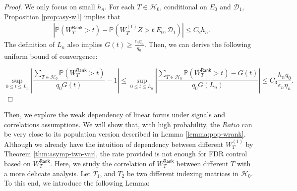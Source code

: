 \documentclass[12pt]{article}
\newcommand{\abs}[1]{\left\lvert#1\right\rvert}
\newcommand{\PP}{\mathbb{P}}
\newcommand{\cH}{\mathcal{H}}
\newcommand{\cD}{\mathcal{D}}
\def\PP{{\mathbb P}}
\theoremstyle{plain}
\begin{document}
\begin{proof}
We only focus on small $h_n$. For each $T\in \cH_0$, conditional on $E_0$ and $\cD_1$, Proposition \ref{prop:asy-w1} implies that 
\begin{equation*}
    \begin{aligned}
    &\abs{\PP(W_T^\mathsf{Rank}>t )-\PP( {W}^{(1)}_{T} Z > t |E_0,\cD_1 )} \le C_2 h_n.
    \end{aligned}
\end{equation*}
The definition of $L_n$ also implies $G(t)\ge \frac{\epsilon_n \eta_n}{q_0}$.
Then, we can derive the following uniform bound of convergence:

\begin{equation*}
    \sup\limits_{0\le t \le L_n} \abs{\frac{ \sum_{T\in\cH_0}\PP(W_T^\mathsf{Rank}>t ) }{q_0 G(t) } -1 }\le \sup\limits_{0\le t \le L_n} \abs{\frac{ \sum_{T\in\cH_0}\PP(W_T^\mathsf{Rank}>t )-G(t) }{q_0 G(L_n) } } \le C_3 \frac{h_n q_0}{\epsilon_n \eta_n }.
\end{equation*}
\end{proof}

Then, we explore the weak dependency of linear forms under signals and correlations assumptions. We will show that, with high probability, the $Ratio$ can be very close to its population version described in Lemma \ref{lemma:pop-wrank}. Although we already have the intuition of dependency between different $W_T^{(1)}$ by Theorem \ref{thm:asymp-two-var}, the rate provided is not enough for FDR control based on $W_T^{\mathsf{Rank} }$. Here, we study the correlation of $W_T^{\mathsf{Rank} }$ between different $T$ with a more delicate analysis. Let $T_1$, and $T_2$ be two different indexing matrices in $\cH_0$. To this end, we introduce the following Lemma:
\end{document}
